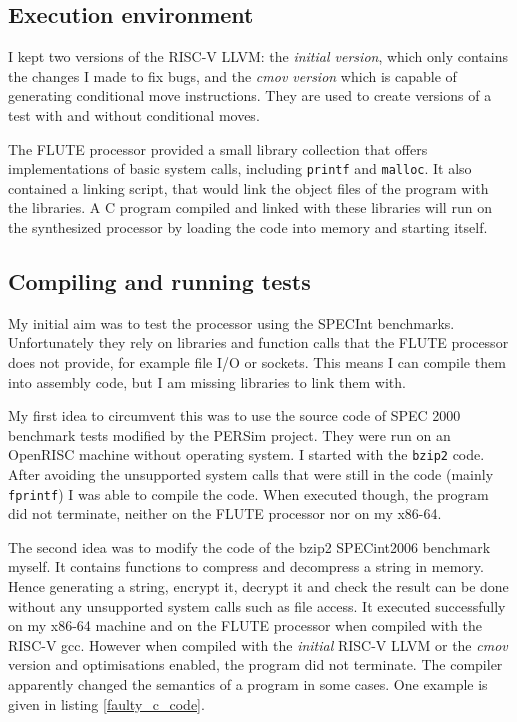\documentclass[12pt,twoside,notitlepage]{report}
\begin{document}
\subsection{Execution environment}
I kept two versions of the RISC-V LLVM: the \textit{initial version}, which only contains the changes I made to fix bugs, and the \textit{cmov version} which is capable of generating conditional move instructions. They are used to create versions of a test with and without conditional moves.

The FLUTE processor provided a small library collection that offers implementations of basic system calls, including \texttt{printf} and \texttt{malloc}. It also contained a linking script, that would link the object files of the program with the libraries. A C program compiled and linked with these libraries will run on the synthesized processor by loading the code into memory and starting itself.

\subsection{Compiling and running tests}

My initial aim was to test the processor using the SPECInt benchmarks. Unfortunately they rely on libraries and function calls that the FLUTE processor does not provide, for example file I/O or sockets. This means I can compile them into assembly code, but I am missing libraries to link them with.

My first idea to circumvent this was to use the source code of SPEC 2000 benchmark tests modified by the PERSim project\cite{persim}. They were run on an OpenRISC machine without operating system. I started with the \texttt{bzip2} code. After avoiding the unsupported system calls that were still in the code (mainly \texttt{fprintf}) I was able to compile the code. When executed though, the program did not terminate, neither on the FLUTE processor nor on my x86-64.

The second idea was to modify the code of the bzip2 SPECint2006 benchmark myself. It contains functions to compress and decompress a string in memory.  Hence generating a string, encrypt it, decrypt it and check the result can be done without any unsupported system calls such as file access. It executed successfully on my x86-64 machine and on the FLUTE processor when compiled with the RISC-V gcc. However when compiled with the \textit{initial} RISC-V LLVM or the \textit{cmov} version and optimisations enabled, the program did not terminate. The compiler apparently changed the semantics of a program in some cases. One example is given in listing \ref{faulty_c_code}.
\end{document}
